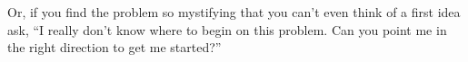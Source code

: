 \begin{description}
    Or, if you find the problem so mystifying that you can't even
    think of a first idea ask, ``I really don't know where to begin on
    this problem. Can you point me in the right direction to get me
    started?''

\end{description}




